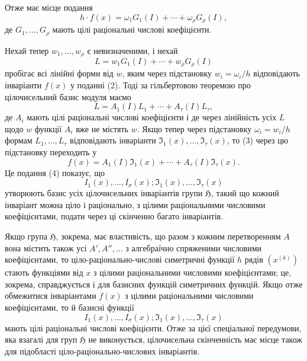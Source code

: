 \documentclass[11pt]{article}
\providecommand{\frH}{\mathfrak H}
\begin{document}
Отже має місце подання
\begin{equation}
        h\cdot f(x)=\omega_1G_1(I)+\cdots+\omega_\rho G_\rho(I),
\end{equation}
де \(G_1,\ldots,G_\rho\) мають цілі раціональні числові коефіцієнти.

Нехай тепер \(w_1,\ldots,w_\rho\) є невизначеними, і нехай
\[
        L=w_1G_1(I)+\cdots+w_\rho G_\rho(I)
\]
пробігає всі лінійні форми від \(w\), яким через підстановку \(w_i=\omega_i/h\) відповідають інваріанти \(f(x)\) у поданні (2). Тоді за гільбертовою теоремою про цілочисельний базис модуля маємо
\begin{equation}
        L=A_1(I)L_1+\cdots+A_\tau(I)L_\tau,
\end{equation}
де \(A_i\) мають цілі раціональні числові коефіцієнти і де через лінійність усіх \(L\) щодо \(w\) функції \(A_i\) вже не містять \(w\). Якщо тепер через підстановку \(\omega_i=w_i/h\) формам \(L_1,\ldots,L_\tau\) відповідають інваріанти \(\mathfrak I_1(x),\ldots,\mathfrak I_\tau(x)\), то (3) через цю підстановку переходить у
\begin{equation}
        f(x)=A_1(I)\mathfrak I_1(x)+\cdots+A_\tau(I)\mathfrak I_\tau(x).
\end{equation}
Це подання (4) показує, що
\[
        I_1(x),\ldots,I_\sigma(x);\mathfrak I_1(x),\ldots,\mathfrak I_\tau(x)
\]
утворюють базис усіх цілочисельних інваріантів групи \(\frH\), такий що кожний інваріант можна ціло і раціонально, з цілими раціональними числовими коефіцієнтами, подати через ці скінченно багато інваріантів.

Якщо група \(\frH\), зокрема, має властивість, що разом з кожним перетворенням \(A\) вона містить також усі \(A',A'',\ldots\) з алгебраїчно спряженими числовими коефіцієнтами, то ціло-раціонально-числові симетричні функції \(h\) рядів \((x^{(k)})\) стають функціями від \(x\) з цілими раціональними числовими коефіцієнтами; це, зокрема, справджується і для базисних функцій симетричних функцій. Якщо отже обмежитися інваріантами \(f(x)\) з цілими раціональними числовими коефіцієнтами, то й базисні функції
\[
        I_1(x),\ldots,I_\sigma(x);\mathfrak I_1(x),\ldots,\mathfrak I_\tau(x)
\]
мають цілі раціональні числові коефіцієнти. Отже за цієї спеціальної передумови, яка взагалі для груп \(\frH\) не виконується, цілочисельна скінченність має місце також для підобласті ціло-раціонально-числових інваріантів.
\end{document}
